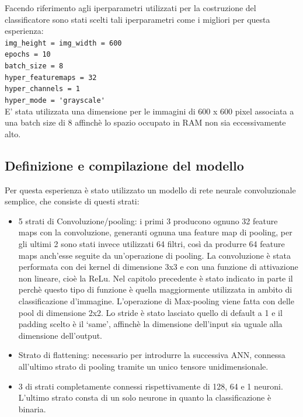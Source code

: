 Facendo riferimento agli iperparametri utilizzati per la costruzione del classificatore sono stati
 scelti tali iperparametri come i migliori per questa esperienza:\\
\lstinline{img_height = img_width = 600}\\
\lstinline{epochs = 10}\\
\lstinline{batch_size = 8}\\
\lstinline{hyper_featuremaps = 32}\\
\lstinline{hyper_channels = 1}\\
\lstinline{hyper_mode = 'grayscale'}\\

E’ stata utilizzata una dimensione per le immagini di 600 x 600 pixel associata a una batch size di 8
 affinchè lo spazio occupato in RAM non sia eccessivamente alto.  \\

\subsection{Definizione e compilazione del modello}
Per questa esperienza è stato utilizzato un modello di rete neurale convoluzionale semplice, che consiste di questi strati:\\
\begin{itemize}
\item 5 strati di Convoluzione/pooling: i primi 3 producono ognuno 32 feature maps con la convoluzione, 
generanti ognuna una feature map di pooling, per gli ultimi 2 sono stati invece utilizzati 64 filtri, 
così da produrre 64 feature maps anch’esse seguite da un’operazione di pooling. La convoluzione è stata performata
 con dei kernel di dimensione 3x3 e con una funzione di attivazione non lineare, cioè la ReLu. Nel capitolo precedente
  è stato indicato in parte il perchè questo tipo di funzione è quella maggiormente utilizzata in ambito di
   classificazione d’immagine. 
           L'operazione di Max-pooling viene fatta con delle pool di dimensione
           2x2. Lo stride è stato lasciato quello di default a 1 e il padding scelto è il ‘same’, affinchè la
            dimensione dell’input sia uguale alla dimensione dell’output. 
\item Strato di flattening: necessario per introdurre la successiva ANN, connessa all’ultimo strato
 di pooling tramite un unico tensore unidimensionale.
\item 3 di strati completamente connessi rispettivamente di 128, 64 e 1 neuroni. 
L’ultimo strato consta di un solo neurone in quanto la classificazione è binaria. 
\end{itemize}


